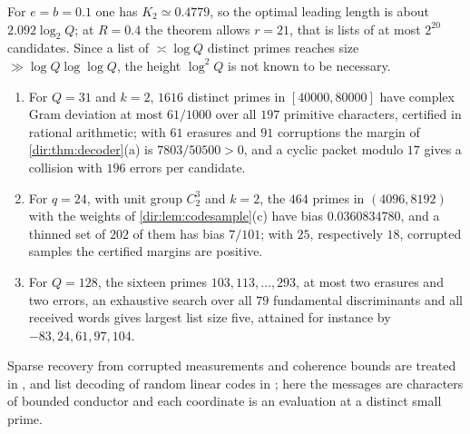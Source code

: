 For $e=b=0.1$ one has $K_2\simeq0.4779$, so the optimal leading length is about $2.092\log_2Q$; at
$R=0.4$ the theorem allows $r=21$, that is lists of at most $2^{20}$ candidates. Since a list of
$\asymp\log Q$ distinct primes reaches size $\gg\log Q\log\log Q$, the height $\log^2Q$ is not known to be
necessary.

\begin{example}\label{dir:ex:codes}
\begin{enumerate}[label=\textup{(\arabic*)}]
\item For $Q=31$ and $k=2$, $1616$ distinct primes in $[40000,80000]$ have complex Gram deviation at most
$61/1000$ over all $197$ primitive characters, certified in rational arithmetic; with $61$ erasures and $91$
corruptions the margin of \cref{dir:thm:decoder}(a) is $7803/50500>0$, and a cyclic packet modulo $17$
gives a collision with $196$ errors per candidate.
\item For $q=24$, with unit group $C_2^3$ and $k=2$, the $464$ primes in $(4096,8192)$ with the weights of
\cref{dir:lem:codesample}(c) have bias $0.0360834780$, and a thinned set of $202$ of them has bias $7/101$;
with $25$, respectively $18$, corrupted samples the certified margins are positive.
\item For $Q=128$, the sixteen primes $103,113,\dots,293$, at most two erasures and two errors, an exhaustive
search over all $79$ fundamental discriminants and all received words gives largest list size five,
attained for instance by $-83,24,61,97,104$.
\end{enumerate}
\end{example}

Sparse recovery from corrupted measurements and coherence bounds are treated in
\cite{StuderKuppingerPopeBolcskei2012Recovery,IosevichMayeli2023Uncertainty}, and list decoding of random
linear codes in \cite{GuruswamiHastadKopparty2011List}; here the messages are characters of bounded
conductor and each coordinate is an evaluation at a distinct small prime.

